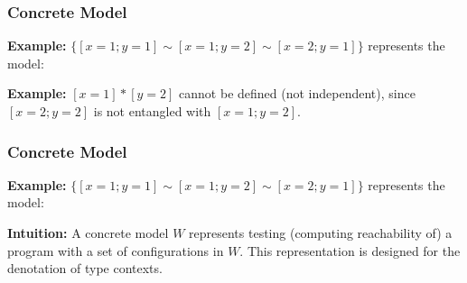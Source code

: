 \begin{frame}[fragile]
    \frametitle{Concrete Model}

\textbf{Example:} $\{[x=1;y=1] \sim [x=1;y=2] \sim [x=2;y=1]\}$ represents the model:


    \textbf{Example:} $[x=1] * [y = 2]$ cannot be defined (not independent), since $[x=2;y=2]$ is not entangled with $[x=1;y=2]$.
\end{frame}

\begin{frame}[fragile]
    \frametitle{Concrete Model}

\textbf{Example:} $\{[x=1;y=1] \sim [x=1;y=2] \sim [x=2;y=1]\}$ represents the model:


    \textbf{Intuition:} A concrete model $W$ represents testing (computing reachability of) a program with a set of configurations in $W$. This representation is designed for the denotation of type contexts.
\end{frame}


